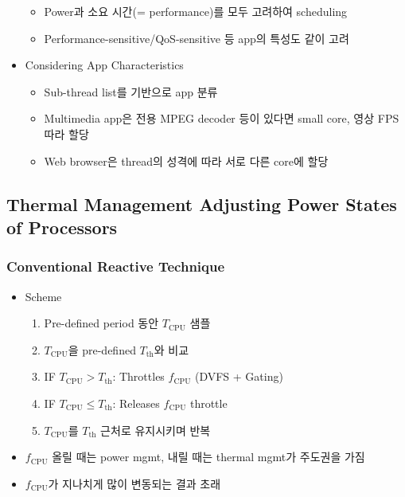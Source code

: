 \begin{itemize}
    \begin{itemize}
        \item Power과 소요 시간(= performance)를 모두 고려하여 scheduling
        \item Performance-sensitive/QoS-sensitive 등 app의 특성도 같이 고려
    \end{itemize}
    \item Considering App Characteristics
    \begin{itemize}
        \item Sub-thread list를 기반으로 app 분류
        \item Multimedia app은 전용 MPEG decoder 등이 있다면 small core, 영상 FPS 따라 할당
        \item Web browser은 thread의 성격에 따라 서로 다른 core에 할당
    \end{itemize}
\end{itemize}

\subsection{Thermal Management Adjusting Power States of Processors}

\subsubsection*{Conventional Reactive Technique}
\begin{itemize}
    \item Scheme
    \begin{enumerate}
        \item Pre-defined period 동안 $T_\mathrm{CPU}$ 샘플
        \item $T_\mathrm{CPU}$을 pre-defined $T_\mathrm{th}$와 비교
        \item IF $T_\mathrm{CPU} > T_\mathrm{th}$: Throttles $f_\mathrm{CPU}$ (DVFS + Gating)
        \item IF $T_\mathrm{CPU} \leq T_\mathrm{th}$: Releases $f_\mathrm{CPU}$ throttle
        \item $T_\mathrm{CPU}$를 $T_\mathrm{th}$ 근처로 유지시키며 반복
    \end{enumerate}
    \item $f_\mathrm{CPU}$ 올릴 때는 power mgmt, 내릴 때는 thermal mgmt가 주도권을 가짐
    \item $f_\mathrm{CPU}$가 지나치게 많이 변동되는 결과 초래
\end{itemize}

